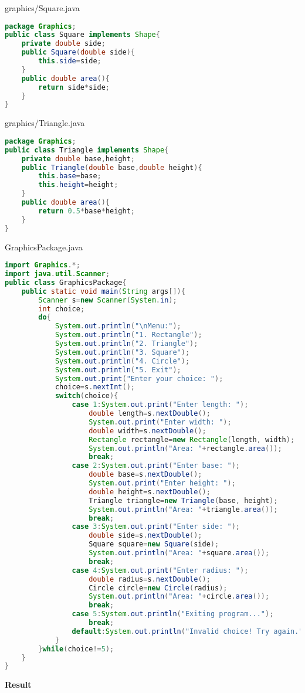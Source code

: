 graphics/Square.java
\begin{lstlisting}[language=Java]
package Graphics;
public class Square implements Shape{
	private double side;
	public Square(double side){
		this.side=side;
	}
	public double area(){
		return side*side;
	}
}
\end{lstlisting}

graphics/Triangle.java
\begin{lstlisting}[language=Java]
package Graphics;
public class Triangle implements Shape{
	private double base,height;
	public Triangle(double base,double height){
		this.base=base;
		this.height=height;
	}
	public double area(){
		return 0.5*base*height;
	}
}
\end{lstlisting}

GraphicsPackage.java
\begin{lstlisting}[language=Java]
import Graphics.*;
import java.util.Scanner;
public class GraphicsPackage{
	public static void main(String args[]){
		Scanner s=new Scanner(System.in);
		int choice;
		do{
			System.out.println("\nMenu:");
			System.out.println("1. Rectangle");
			System.out.println("2. Triangle");
			System.out.println("3. Square");
			System.out.println("4. Circle");
			System.out.println("5. Exit");
			System.out.print("Enter your choice: ");
			choice=s.nextInt();
			switch(choice){
				case 1:System.out.print("Enter length: ");
					double length=s.nextDouble();
					System.out.print("Enter width: ");
					double width=s.nextDouble();
					Rectangle rectangle=new Rectangle(length, width);
					System.out.println("Area: "+rectangle.area());
					break;
				case 2:System.out.print("Enter base: ");
					double base=s.nextDouble();
					System.out.print("Enter height: ");
					double height=s.nextDouble();
					Triangle triangle=new Triangle(base, height);
					System.out.println("Area: "+triangle.area());
					break;
				case 3:System.out.print("Enter side: ");
					double side=s.nextDouble();
					Square square=new Square(side);
					System.out.println("Area: "+square.area());
					break;
				case 4:System.out.print("Enter radius: ");
					double radius=s.nextDouble();
					Circle circle=new Circle(radius);
					System.out.println("Area: "+circle.area());
					break;
				case 5:System.out.println("Exiting program...");
					break;
				default:System.out.println("Invalid choice! Try again.");
			}
		}while(choice!=5);
	}
}
\end{lstlisting}

\vspace{0.5cm}
\textbf{Result}
\vspace{0.5cm}


